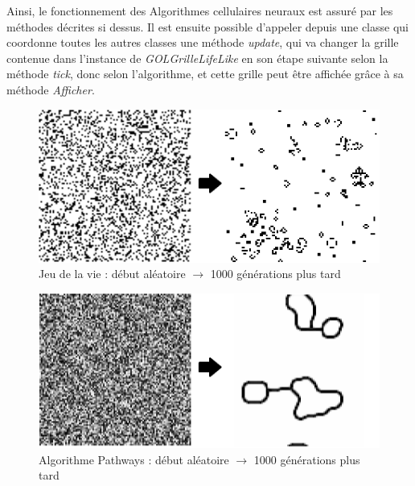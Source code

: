 \par Ainsi, le fonctionnement des Algorithmes cellulaires neuraux est assuré par les méthodes décrites si dessus. Il est ensuite possible d'appeler depuis une classe qui coordonne toutes les autres classes une méthode \textit{update}, qui va changer la grille contenue dans l'instance de \textit{GOLGrilleLifeLike} en son étape suivante selon la méthode \textit{tick}, donc selon l'algorithme, et cette grille peut être affichée grâce à sa méthode \textit{Afficher}.

\begin{figure}[H]
        \center
        \includegraphics[scale=0.5]{images/imgAlgoNeural/GOLAvantApres.png}
        \caption{Jeu de la vie : début aléatoire $\rightarrow$ 1000 générations plus tard}
\end{figure}

\begin{figure}[H]
        \center
        \includegraphics[scale=0.5]{images/imgAlgoNeural/PathwaysAvantApres.png}
        \caption{Algorithme Pathways : début aléatoire $\rightarrow$ 1000 générations plus tard}
\end{figure}